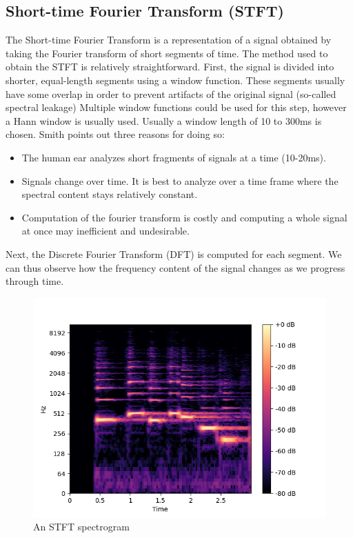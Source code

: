 \documentclass[a4paper, 12pt, twoside]{report}
\begin{document}
\subsection{Short-time Fourier Transform (STFT)}
\label{sec:org5ad94c1}
The Short-time Fourier Transform is a representation of a signal obtained by taking the Fourier transform of short segments of time. The method used to obtain the STFT is relatively straightforward. First, the signal is divided into shorter, equal-length segments using a window function. These segments usually have some overlap in order to prevent artifacts of the original signal (so-called spectral leakage) Multiple window functions could be used for this step, however a Hann window is usually used. Usually a window length of 10 to 300ms is chosen. Smith \cite{book} points out three reasons for doing so:

\begin{itemize}
\item The human ear analyzes short fragments of signals at a time (10-20ms).
\item Signals change over time. It is best to analyze over a time frame where the spectral content stays relatively constant.
\item Computation of the fourier transform is costly and computing a whole signal at once may inefficient and undesirable.
\end{itemize}

Next, the Discrete Fourier Transform (DFT) is computed for each segment. We can thus observe how the frequency content of the signal changes as we progress through time.

\begin{figure}[h!]
\centering
\includegraphics[width=\textwidth]{./Figures/orig_stft.png}
\caption{An STFT spectrogram}
\end{figure}
\end{document}
